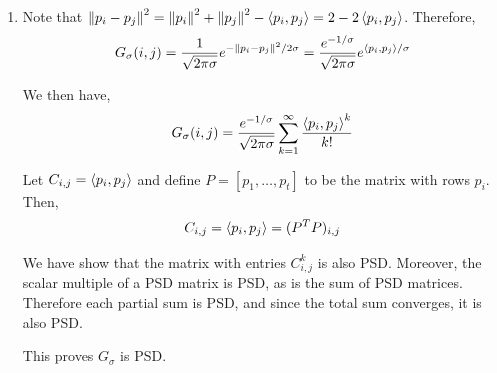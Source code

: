 \documentclass[10pt]{article}
\begin{document}
\begin{solution}[Solution]
\begin{enumerate}[label=(\alph*)]
   \item
        Note that \( \left\lVert p_i-p_j\right\rVert^2 = \left\lVert p_i\right\rVert^2 + \left\lVert p_j\right\rVert^2 - \left\langle p_i,p_j \right\rangle = 2-2\left\langle p_i,p_j \right\rangle \). Therefore,
        \begin{align*}
            G_\sigma(i,j) = \frac{1}{\sqrt{2\pi\sigma}}e^{-\left\lVert p_i-p_j\right\rVert^2/2\sigma}
            = \frac{e^{-1/\sigma}}{\sqrt{2\pi\sigma}}e^{\left\langle p_i,p_j \right\rangle/\sigma}
        \end{align*}
        
        We then have,
        \begin{align*}
            G_\sigma(i,j) = \frac{e^{-1/\sigma}}{\sqrt{2\pi\sigma}}\sum_{k=1}^{\infty} \frac{\left\langle p_i,p_j \right\rangle^k}{k!} 
        \end{align*}
        
        
        Let \( C_{i,j} = \left\langle p_i,p_j \right\rangle \) and define \( P = [p_1,\ldots,p_t] \) to be the matrix with rows \( p_i \). Then,
        \begin{align*}
            C_{i,j} = \left\langle p_i,p_j \right\rangle = ( P^TP )_{i,j}  
        \end{align*}

        We have show that the matrix with entries \( C_{i,j}^k \) is also PSD. Moreover, the scalar multiple of a PSD matrix is PSD, as is the sum of PSD matrices. Therefore each partial sum is PSD, and since the total sum converges, it is also PSD.
      
      This proves \( G_\sigma \) is PSD.
      

       

\end{enumerate}
\end{solution}
\end{document}
